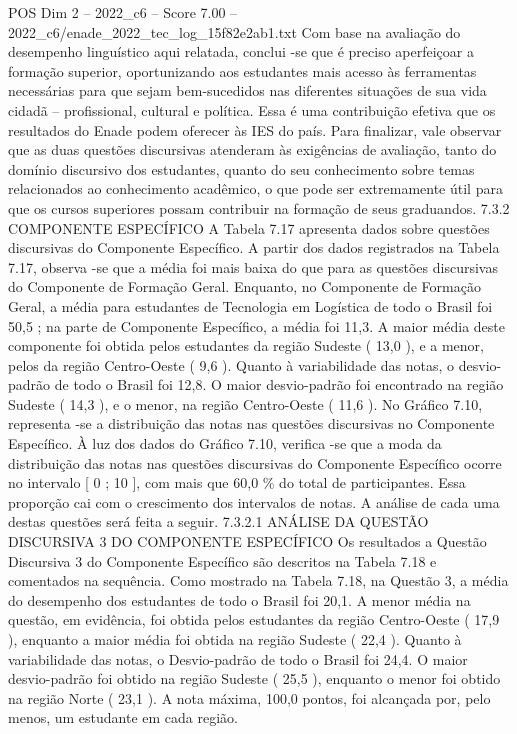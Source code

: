 \begin{textsample}{POS Dim 2 – 2022\_c6 – Score 7.00 – 2022\_c6/enade\_2022\_tec\_log\_15f82e2ab1.txt}
Com base na avaliação do desempenho linguístico aqui relatada, conclui -se que é preciso aperfeiçoar a formação superior, oportunizando aos estudantes mais acesso às ferramentas necessárias para que sejam bem-sucedidos nas diferentes situações de sua vida cidadã – profissional, cultural e política.
Essa é uma contribuição efetiva que os resultados do Enade podem oferecer às IES do país.
Para finalizar, vale observar que as duas questões discursivas atenderam às exigências de avaliação, tanto do domínio discursivo dos estudantes, quanto do seu conhecimento sobre temas relacionados ao conhecimento acadêmico, o que pode ser extremamente útil para que os cursos superiores possam contribuir na formação de seus graduandos. 7.3.2 COMPONENTE ESPECÍFICO A Tabela 7.17 apresenta dados sobre questões discursivas do Componente Específico.
A partir dos dados registrados na Tabela 7.17, observa -se que a média foi mais baixa do que para as questões discursivas do Componente de Formação Geral.
Enquanto, no Componente de Formação Geral, a média para estudantes de Tecnologia em Logística de todo o Brasil foi 50,5 ; na parte de Componente Específico, a média foi 11,3.
A maior média deste componente foi obtida pelos estudantes da região Sudeste ( 13,0 ), e a menor, pelos da região Centro-Oeste ( 9,6 ).
Quanto à variabilidade das notas, o desvio-padrão de todo o Brasil foi 12,8.
O maior desvio-padrão foi encontrado na região Sudeste ( 14,3 ), e o menor, na região Centro-Oeste ( 11,6 ).
No Gráfico 7.10, representa -se a distribuição das notas nas questões discursivas no Componente Específico.
À luz dos dados do Gráfico 7.10, verifica -se que a moda da distribuição das notas nas questões discursivas do Componente Específico ocorre no intervalo [ 0 ; 10 ], com mais que 60,0 \% do total de participantes.
Essa proporção cai com o crescimento dos intervalos de notas.
A análise de cada uma destas questões será feita a seguir. 7.3.2.1 ANÁLISE DA QUESTÃO DISCURSIVA 3 DO COMPONENTE ESPECÍFICO Os resultados a Questão Discursiva 3 do Componente Específico são descritos na Tabela 7.18 e comentados na sequência.
Como mostrado na Tabela 7.18, na Questão 3, a média do desempenho dos estudantes de todo o Brasil foi 20,1.
A menor média na questão, em evidência, foi obtida pelos estudantes da região Centro-Oeste ( 17,9 ), enquanto a maior média foi obtida na região Sudeste ( 22,4 ).
Quanto à variabilidade das notas, o Desvio-padrão de todo o Brasil foi 24,4.
O maior desvio-padrão foi obtido na região Sudeste ( 25,5 ), enquanto o menor foi obtido na região Norte ( 23,1 ).
A nota máxima, 100,0 pontos, foi alcançada por, pelo menos, um estudante em cada região.

\end{textsample}
